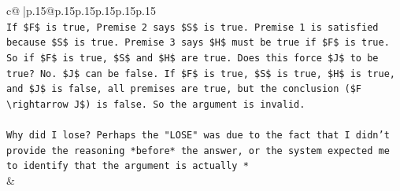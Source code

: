 \documentclass{article}
\begin{document}
{\begin{supertabular}{c@{$\;$}|p{.15\linewidth}@{}p{.15\linewidth}p{.15\linewidth}p{.15\linewidth}p{.15\linewidth}p{.15\linewidth}}
{{{\\ 
\texttt{If \$F\$ is true, Premise 2 says \$S\$ is true. Premise 1 is satisfied because \$S\$ is true. Premise 3 says \$H\$ must be true if \$F\$ is true. So if \$F\$ is true, \$S\$ and \$H\$ are true. Does this force \$J\$ to be true? No. \$J\$ can be false. If \$F\$ is true, \$S\$ is true, \$H\$ is true, and \$J\$ is false, all premises are true, but the conclusion (\$F \textbackslash{}rightarrow J\$) is false. So the argument is invalid.} \\
\\ 
\texttt{Why did I lose? Perhaps the "LOSE" was due to the fact that I didn't provide the reasoning *before* the answer, or the system expected me to identify that the argument is actually *} \\
            }
        }
    }
    & \\ \\

\end{supertabular}
}
\end{document}
